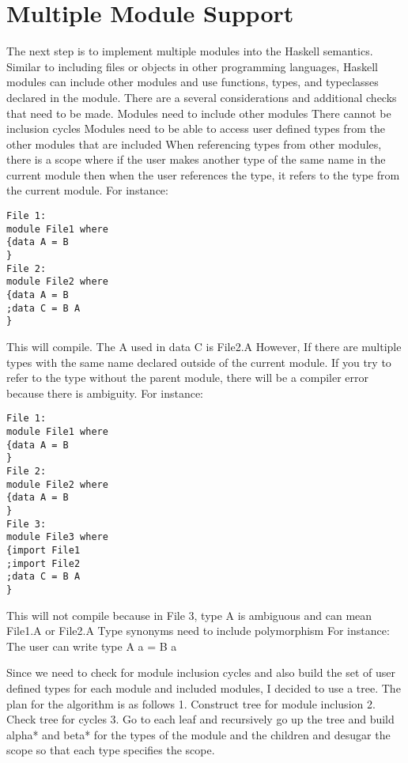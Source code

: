 \chapter{Multiple Module Support}
The next step is to implement multiple modules into the Haskell semantics. Similar to including files or objects in other programming languages, Haskell modules can include other modules and use functions, types, and typeclasses declared in the module.
There are a several considerations and additional checks that need to be made.
Modules need to include other modules
There cannot be inclusion cycles
Modules need to be able to access user defined types from the other modules that are included
When referencing types from other modules, there is a scope where
if the user makes another type of the same name in the current module
then when the user references the type, it refers to the type from the current module.
For instance:
\begin{lstlisting}
File 1:
module File1 where
{data A = B
}
File 2:
module File2 where
{data A = B
;data C = B A
}
\end{lstlisting}
	This will compile. The A used in data C is File2.A
However, If there are multiple types with the same name declared outside of the current module. If you try to refer to the type without the parent module, there will be a compiler error because there is ambiguity.
For instance:
\begin{lstlisting}
File 1:
module File1 where
{data A = B
}
File 2:
module File2 where
{data A = B
}
File 3:
module File3 where
{import File1
;import File2
;data C = B A
}
\end{lstlisting}

	This will not compile because in File 3, type A is ambiguous and can mean File1.A or File2.A
Type synonyms need to include polymorphism
For instance:
	The user can write
	type A a = B a

Since we need to check for module inclusion cycles and also build the set of user defined types for each module and included modules, I decided to use a tree.
The plan for the algorithm is as follows
1. Construct tree for module inclusion
2. Check tree for cycles
3. Go to each leaf and recursively go up the tree and build alpha* and beta* for the types of the module and the children and desugar the scope so that each type specifies the scope.


